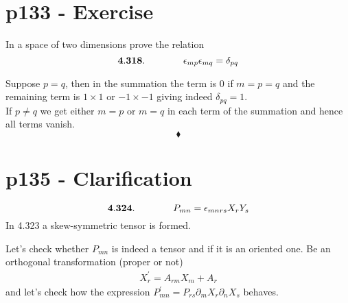 \section{p133 - Exercise}
\begin{tcolorbox}
In a space of two dimensions prove the relation
$$\mathbf{4.318.}\quad\quad\quad\quad \epsilon_{mp}\epsilon_{mq} = \delta_{pq}$$
\end{tcolorbox}
Suppose $p=q$, then in the summation the term is $0$ if $m=p=q$ and the remaining term is $1\times 1$ or $-1\times -1$ giving indeed $\delta_{pq}=1$.\\ 
If  $p\neq q$ we get either $m=p$ or $m=q$ in each term of the summation and hence all terms vanish.
$$\blacklozenge$$
\newpage

\section{p135 - Clarification}
\begin{tcolorbox}
$$\mathbf{4.324.}\quad\quad\quad\quad P_{mn}= \epsilon_{mnrs}X_rY_s$$
In 4.323 a skew-symmetric tensor is formed.
\end{tcolorbox}
Let's check whether $P_{mn}$ is indeed a tensor and if it is an oriented one.
Be an orthogonal transformation (proper or not)
\begin{align}
X^{'}_r = A_{rm}X_m+A_r
\end{align}
and let's check how the expression $P^{'}_{mn}= P_{rs}\partial_m X_r \partial_n X_s$ behaves.

